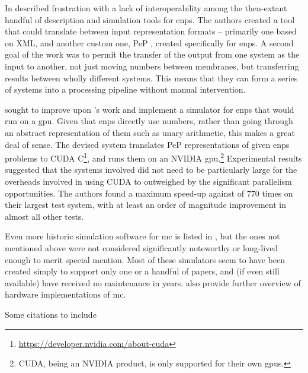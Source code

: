 In \cite{Raghavan2020a} \citeauthor{Raghavan2020a} described frustration with a lack of interoperability among the then-extant handful of description and simulation tools for \gls{enps}.  The authors created a tool that could translate between input representation formats -- primarily one based on XML, and another custom one, PeP \cite{Florea2017,Florea2018}, created specifically for \gls{enps}.  A second goal of the work was to permit the transfer of the output from one system as the input to another, \ie{} not just moving numbers between membranes, but transferring results between wholly different systems.  This means that they can form a series of systems into a processing pipeline without manual intervention.

\citeauthor{Raghavan2020} \cite{Raghavan2020} sought to improve upon \citeauthor{Florea2018}'s work \cite{Florea2018} and implement a simulator for \gls{enps} that would run on a \gls{gpu}.  Given that \gls{enps} directly use numbers, rather than going through an abstract representation of them such as unary arithmetic, this makes a great deal of sense.  The devised system translates PeP representations of given \gls{enps} problems to CUDA C\footnote{\url{https://developer.nvidia.com/about-cuda}}, and runs them on an NVIDIA \gls{gpu}.\footnote{CUDA, being an NVIDIA product, is only supported for their own \glspl{gpu}.}  Experimental results suggested that the systems involved did not need to be particularly large for the overheads involved in using CUDA to outweighed by the significant parallelism opportunities.  The authors found a maximum speed-up against \cite{Florea2018} of 770 times on their largest test system, with at least an order of magnitude improvement in almost all other tests.

Even more historic simulation software for \gls{mc} is listed in \cite{Raghavan2016}, but the ones not mentioned above were not considered significantly noteworthy or long-lived enough to merit special mention.  Most of these simulators seem to have been created simply to support only one or a handful of papers, and (if even still available) have received no maintenance in years.  \cite{Zhang2020} \cite{Zhang2020} also provide further overview of hardware implementations of \gls{mc}. %

\begin{anfxwarning}{Some citations to include}
\cite{Liu2016,Oltean2008}
\end{anfxwarning}

